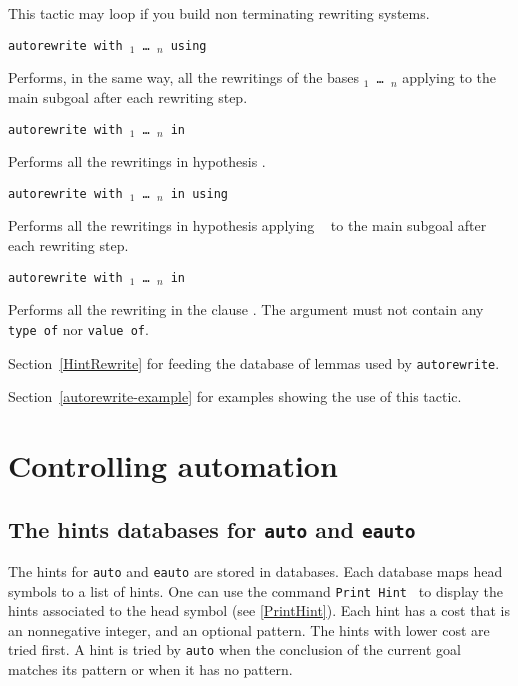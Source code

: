 \begin{coq_example*}
\Warning{} This tactic may loop if you build non terminating rewriting systems.

\begin{Variant}
\item {\tt autorewrite with \ident$_1$ \mbox{\dots} \ident$_n$ using \tac}

Performs, in the same way, all the rewritings of the bases {\tt \ident$_1$
\mbox{\dots} \ident$_n$} applying {\tt \tac} to the main subgoal after each
rewriting step.

\item {\tt autorewrite with \ident$_1$ \mbox{\dots} \ident$_n$ in \qualid}

  Performs all the rewritings in hypothesis {\qualid}.
\item {\tt autorewrite with \ident$_1$ \mbox{\dots} \ident$_n$ in {\qualid} using \tac}

  Performs all  the rewritings  in hypothesis {\qualid}  applying {\tt
    \tac} to the main subgoal after each rewriting step.

\item {\tt autorewrite with \ident$_1$ \mbox{\dots} \ident$_n$ in }

  Performs all the rewriting  in the clause .
  The  argument must not contain any \texttt{type of} nor \texttt{value of}.

\end{Variant}

\SeeAlso Section~\ref{HintRewrite} for feeding the database of lemmas used by {\tt autorewrite}.

\SeeAlso Section~\ref{autorewrite-example} for examples showing the use of
this tactic.


\section{Controlling automation}

\subsection{The hints databases for {\tt auto} and {\tt eauto}}
\label{Hints-databases}

The hints for \texttt{auto} and \texttt{eauto} are stored in
databases.  Each database maps head symbols to a list of hints. One can
use the command \texttt{Print Hint \ident} to display the hints
associated to the head symbol \ident{} (see \ref{PrintHint}). Each
hint has a cost that is an nonnegative integer, and an optional pattern.
The hints with lower cost are tried first. A hint is tried by
\texttt{auto} when the conclusion of the current goal
matches its pattern or when it has no pattern.


\end{coq_example*}
